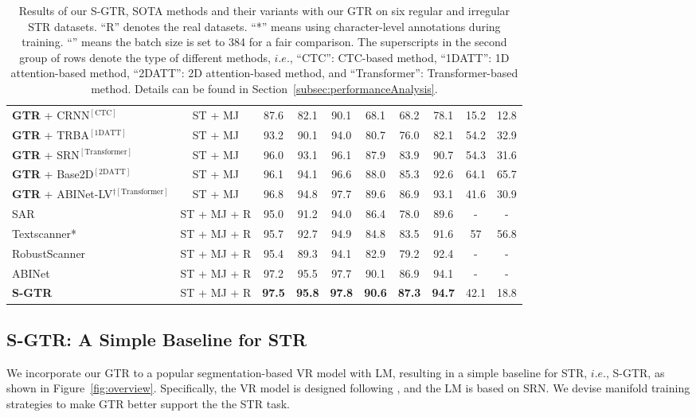 \documentclass[letterpaper]{article} \usepackage{aaai22}  \usepackage{times}  \usepackage{helvet}  \usepackage{courier}  \usepackage[hyphens]{url}  \usepackage{graphicx} \urlstyle{rm} \def\UrlFont{\rm}  \usepackage{natbib}  \usepackage{caption} \DeclareCaptionStyle{ruled}{labelfont=normalfont,labelsep=colon,strut=off} \frenchspacing  \setlength{\pdfpagewidth}{8.5in}  \setlength{\pdfpageheight}{11in}
\newcommand{\bt}{\color{black}}
\begin{document}
\begin{table*}[t]
\begin{tabular}{l|c|c|c|c|c|c|c|c|c}
		\textbf{GTR} + CRNN$^{[\text{CTC}]}$ &ST + MJ  & 87.6 & 82.1 & 90.1& 68.1 & 68.2 & 78.1 &15.2 &12.8\\
		\textbf{GTR} + TRBA$^{[\text{1DATT}]}$ &ST + MJ  & 93.2 & 90.1 & 94.0& 80.7 & 76.0 & 82.1 & 54.2 & 32.9\\
		\textbf{GTR} + SRN$^{[\text{Transformer}]}$ &ST + MJ   & 96.0 & 93.1 & 96.1 & 87.9 & 83.9 & 90.7 &54.3 &31.6\\
		\textbf{GTR} + Base2D$^{[\text{2DATT}]}$  &ST + MJ  & 96.1 & 94.1 & 96.6 & 88.0 & 85.3 & 92.6& 64.1 & 65.7\\
\bt \textbf{GTR} + ABINet-LV$^{\dag[\text{Transformer}]}$ &ST + MJ & 96.8   & 94.8  & 97.7  & 89.6   & 86.9  & 93.1
        & 41.6 & 30.9 \\
		\hline 
		SAR\cite{li2019show}& ST + MJ + R & 95.0 & 91.2 & 94.0 & 86.4 & 78.0 & 89.6 &- &-\\
		Textscanner* \cite{wan2020textscanner}  & ST + MJ + R & 95.7 & 92.7 & 94.9 & 84.8 & 83.5 & 91.6 & 57&56.8\\ 
		RobustScanner \cite{yue2020robustscanner} &ST + MJ + R &95.4&89.3&94.1& 82.9&79.2&92.4 &- &-\\
		ABINet \cite{fang2021read} &ST + MJ + R  &97.2	&95.5 &97.7	&90.1 &86.9	&94.1 & -&-\\ 
\bf{S-GTR}    &ST + MJ + R  &\bf{97.5}	&\bf{95.8}	&\bf{97.8}	&\bf{90.6}	&\bf{87.3}	&\bf{94.7} &42.1 &18.8 \\ 
		\hline
	\end{tabular}
	\caption{Results of our S-GTR, SOTA methods and their variants with our GTR on six regular and irregular STR datasets. ``R'' denotes the real datasets. ``*'' means using character-level annotations during training. {\bt ``\dag'' means the batch size is set to 384 for a fair comparison.} The superscripts in the second group of rows denote the type of different methods, $i.e.$, ``CTC'': CTC-based method, ``1DATT'': 1D attention-based method, ``2DATT'': 2D attention-based method, and ``Transformer'': Transformer-based method. Details can be found in Section~\ref{subsec:performanceAnalysis}.}
	\label{tab:main}
\end{table*}




\subsection{S-GTR: A Simple Baseline for STR}



We incorporate our GTR to a popular segmentation-based VR model with LM, resulting in a simple baseline for STR, $i.e.$, S-GTR, as shown in Figure~\ref{fig:overview}. 
{\bt Specifically, the VR model is designed following \cite{wan2020vocabulary}, and the LM is based on SRN.}
We devise manifold training strategies to make GTR better support the the STR task.
\end{document}
